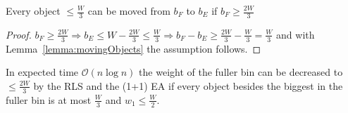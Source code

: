 \begin{corollary}\label{cor:movingObjects}
    Every object \(\le \frac{W}{3}\) can be moved from $b_F$ to $b_E$ if \(b_F \ge \frac{2W}{3}\)
\end{corollary}
\begin{proof}
    \(b_F \ge \frac{2W}{3} \Rightarrow b_E \le W - \frac{2W}{3} \le \frac{W}{3} \Rightarrow b_F - b_E \ge \frac{2W}{3} - \frac{W}{3} = \frac{W}{3}\) and with Lemma~\ref{lemma:movingObjects} the assumption follows.
\end{proof}

\begin{lemma}\label{lemma:movingObjects2}
    In expected time $\mathcal{O}(n\log{}n)$ the weight of the fuller bin can be decreased to \(\le \frac{2W}{3}\) by the RLS and the (1+1) EA if every object besides the biggest in the fuller bin is at most $\frac{W}{3}$ and \(w_1 \le \frac{W}{2}\).
\end{lemma}
